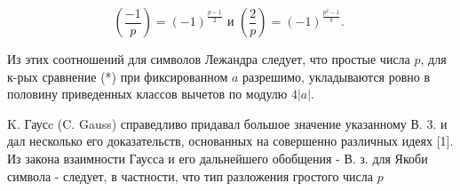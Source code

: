 \documentclass[10pt]{article}
\begin{document}
\[

\left(\frac{-1}{p}\right)=(-1)^{\frac{p-1}{2}} \text { и }\left(\frac{2}{p}\right)=(-1)^{\frac{p^{2}-1}{8}} \text {. }

\]



Из этих соотношений для символов Лежандра следует, что простые числа $p$, для к-рых сравнение (*) при фиксированном $a$ разрешимо, укладываются ровно в половину приведенных классов вычетов по модулю $4|a|$.



K. Гаусc (C. Gauss) справедливо придавал большое значение указанному В. 3. и дал несколько его доказательств, основанных на совершенно различных идеях [1]. Из закона взаимности Гаусса и его дальнейшего обобщения - В. з. для Якоби символа - следует, в частности, что тип разложения гростого числа $p$
\end{document}
